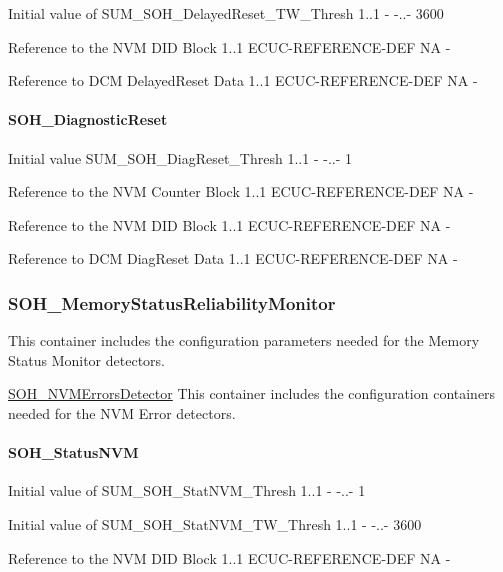 {
{Initial value of SUM_SOH_DelayedReset_TW_Thresh}
{1..1}
{-}
{-..-}
{3600}}

{
{Reference to the NVM DID Block}
{1..1}
{ECUC-REFERENCE-DEF}
{NA}
{-}}

{
{Reference to DCM DelayedReset Data}
{1..1}
{ECUC-REFERENCE-DEF}
{NA}
{-}}


\paragraph{SOH\_DiagnosticReset}

{
{Initial value SUM_SOH_DiagReset_Thresh}
{1..1}
{-}
{-..-}
{1}}

{
{Reference to the NVM Counter Block}
{1..1}
{ECUC-REFERENCE-DEF}
{NA}
{-}}

{
{Reference to the NVM DID Block}
{1..1}
{ECUC-REFERENCE-DEF}
{NA}
{-}}

{
{Reference to DCM DiagReset Data}
{1..1}
{ECUC-REFERENCE-DEF}
{NA}
{-}}

\subsubsection{SOH\_MemoryStatusReliabilityMonitor}
This container includes the configuration parameters needed for the Memory Status Monitor detectors.

\underline{SOH\_NVMErrorsDetector}\newline
This container includes the configuration containers needed for the NVM Error detectors.

\paragraph{SOH\_StatusNVM}

{
{Initial value of SUM_SOH_StatNVM_Thresh}
{1..1}
{-}
{-..-}
{1}}

{
{Initial value of SUM_SOH_StatNVM_TW_Thresh}
{1..1}
{-}
{-..-}
{3600}}

{
{Reference to the NVM DID Block}
{1..1}
{ECUC-REFERENCE-DEF}
{NA}
{-}}

